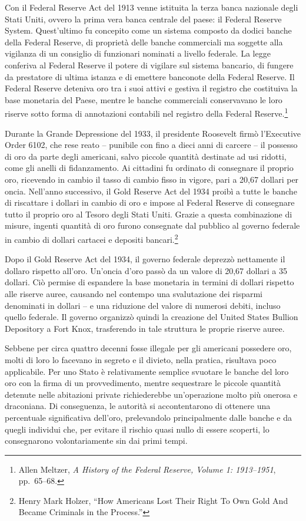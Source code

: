 \documentclass[
  a5paper,
  smalldemyvopaper,10pt,twoside,onecolumn,openright,extrafontsizes,hidelinks]{memoir}
\begin{document}
Con il Federal Reserve Act del 1913 venne istituita la terza banca
nazionale degli Stati Uniti, ovvero la prima vera banca centrale del
paese: il Federal Reserve System. Quest'ultimo fu concepito come un
sistema composto da dodici banche della Federal Reserve, di proprietà
delle banche commerciali ma soggette alla vigilanza di un consiglio di
funzionari nominati a livello federale. La legge conferiva al Federal
Reserve il potere di vigilare sul sistema bancario, di fungere da
prestatore di ultima istanza e di emettere banconote della Federal
Reserve. Il Federal Reserve deteniva oro tra i suoi attivi e gestiva il
registro che costituiva la base monetaria del Paese, mentre le banche
commerciali conservavano le loro riserve sotto forma di annotazioni
contabili nel registro della Federal Reserve.\footnote{Allen Meltzer,
  \emph{A History of the Federal Reserve, Volume 1: 1913--1951},
  pp.~65--68.}

Durante la Grande Depressione del 1933, il presidente Roosevelt firmò
l'Executive Order 6102, che rese reato -- punibile con fino a dieci anni
di carcere -- il possesso di oro da parte degli americani, salvo piccole
quantità destinate ad usi ridotti, come gli anelli di fidanzamento. Ai
cittadini fu ordinato di consegnare il proprio oro, ricevendo in cambio
il tasso di cambio fisso in vigore, pari a 20,67 dollari per oncia.
Nell'anno successivo, il Gold Reserve Act del 1934 proibì a tutte le
banche di riscattare i dollari in cambio di oro e impose al Federal
Reserve di consegnare tutto il proprio oro al Tesoro degli Stati Uniti.
Grazie a questa combinazione di misure, ingenti quantità di oro furono
consegnate dal pubblico al governo federale in cambio di dollari
cartacei e depositi bancari.\footnote{Henry Mark Holzer, ``How Americans
  Lost Their Right To Own Gold And Became Criminals in the Process.''}

Dopo il Gold Reserve Act del 1934, il governo federale deprezzò
nettamente il dollaro rispetto all'oro. Un'oncia d'oro passò da un
valore di 20,67 dollari a 35 dollari. Ciò permise di espandere la base
monetaria in termini di dollari rispetto alle riserve auree, causando
nel contempo una svalutazione dei risparmi denominati in dollari -- e
una riduzione del valore di numerosi debiti, incluso quello federale. Il
governo organizzò quindi la creazione del United States Bullion
Depository a Fort Knox, trasferendo in tale struttura le proprie riserve
auree.

Sebbene per circa quattro decenni fosse illegale per gli americani
possedere oro, molti di loro lo facevano in segreto e il divieto, nella
pratica, risultava poco applicabile. Per uno Stato è relativamente
semplice svuotare le banche del loro oro con la firma di un
provvedimento, mentre sequestrare le piccole quantità detenute nelle
abitazioni private richiederebbe un'operazione molto più onerosa e
draconiana. Di conseguenza, le autorità si accontentarono di ottenere
una percentuale significativa dell'oro, prelevandolo principalmente
dalle banche e da quegli individui che, per evitare il rischio quasi
nullo di essere scoperti, lo consegnarono volontariamente sin dai primi
tempi.
\end{document}
